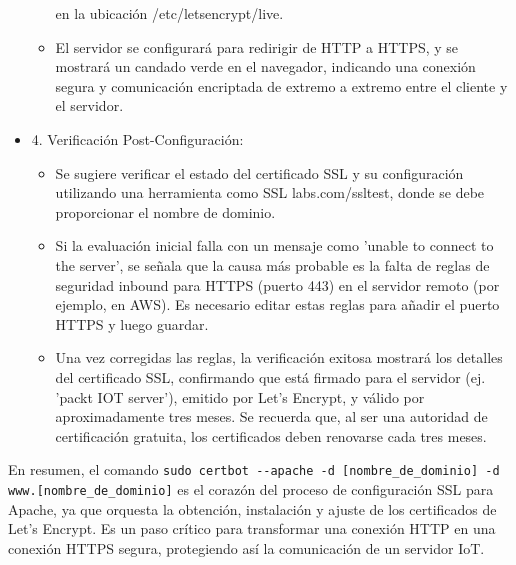 \documentclass{report}
\begin{document}
\begin{itemize}
\begin{itemize}
            en la ubicación /etc/letsencrypt/live.
            \item El servidor se configurará para redirigir de HTTP a HTTPS, y se mostrará un candado verde en el navegador, indicando una 
            conexión segura y comunicación encriptada de extremo a extremo entre el cliente y el servidor.
        \end{itemize}
    \item 4. Verificación Post-Configuración:
        \begin{itemize}
            \item Se sugiere verificar el estado del certificado SSL y su configuración utilizando una herramienta como 
            SSL labs.com/ssltest, donde se debe proporcionar el nombre de dominio.
            \item Si la evaluación inicial falla con un mensaje como 'unable to connect to the server', se señala que la causa más probable 
            es la falta de reglas de seguridad inbound para HTTPS (puerto 443) en el servidor remoto (por ejemplo, en AWS). Es necesario editar 
            estas reglas para añadir el puerto HTTPS y luego guardar.
            \item Una vez corregidas las reglas, la verificación exitosa mostrará los detalles del certificado SSL, confirmando que está 
            firmado para el servidor (ej. 'packt IOT server'), emitido por Let's Encrypt, y válido por aproximadamente tres meses. 
            Se recuerda que, al ser una autoridad de certificación gratuita, los certificados deben renovarse cada tres meses.
        \end{itemize}
\end{itemize}
En resumen, el comando \verb|sudo certbot --apache -d [nombre_de_dominio] -d www.[nombre_de_dominio]| es el corazón del proceso de 
configuración SSL para Apache, ya que orquesta la obtención, instalación y ajuste de los certificados de Let's Encrypt. Es un paso crítico 
para transformar una conexión HTTP en una conexión HTTPS segura, protegiendo así la comunicación de un servidor IoT.
\end{document}
